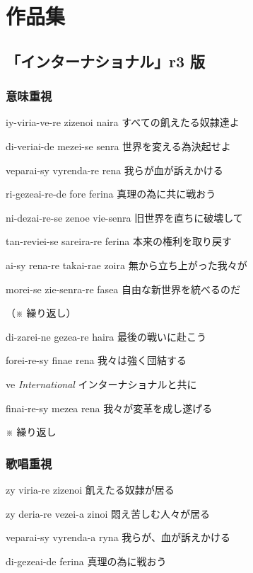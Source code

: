 \chapter{作品集}

\section{「インターナショナル」r3 版}

\subsection{意味重視}

\lyric
{iy-viria-ve-re zizenoi naira}
{すべての飢えたる奴隷達よ}

\lyric
{di-veriai-de mezei-se senra}
{世界を変える為決起せよ}

\lyric
{veparai-sy vyrenda-re rena}
{我らが血が訴えかける}

\lyric
{ri-gezeai-re-de fore ferina}
{真理の為に共に戦おう}

\lyric
{ni-dezai-re-se zenoe vie-senra}
{旧世界を直ちに破壊して}

\lyric
{tan-reviei-se sareira-re ferina}
{本来の権利を取り戻す}

\lyric
{ai-sy rena-re takai-rae zoira}
{無から立ち上がった我々が}

\lyric
{morei-se zie-senra-re fasea}
{自由な新世界を統べるのだ}

（※ 繰り返し）

\lyric
{di-zarei-ne gezea-re haira}
{最後の戦いに赴こう}

\lyric
{forei-re-sy finae rena}
{我々は強く団結する}

\lyric
{ve \emph{International}}
{インターナショナルと共に}

\lyric
{finai-re-sy mezea rena}
{我々が変革を成し遂げる}

※ 繰り返し

\subsection{歌唱重視}

\lyric
{zy viria-re zizenoi}
{飢えたる奴隷が居る}

\lyric
{zy deria-re vezei-a zinoi}
{悶え苦しむ人々が居る}

\lyric
{veparai-sy vyrenda-a ryna}
{我らが、血が訴えかける}

\lyric
{di-gezeai-de ferina}
{真理の為に戦おう}

